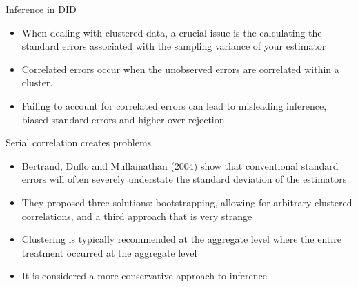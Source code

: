 \documentclass{beamer}
\begin{document}
\begin{frame}{Inference in DID}
	\begin{itemize}
	\item When dealing with clustered data, a crucial issue is the calculating the standard errors associated with the sampling variance of your estimator
 	\item Correlated errors occur when the unobserved errors are correlated within a cluster.
	\item Failing to account for correlated errors can lead to misleading inference, biased standard errors and higher over rejection
	\end{itemize}
\end{frame}


\begin{frame}{Serial correlation creates problems}
  \begin{itemize}
	\item  Bertrand, Duflo and Mullainathan (2004) show that conventional standard errors will often severely understate the standard deviation of the estimators
	\item They proposed three solutions: bootstrapping, allowing for arbitrary clustered correlations, and a third approach that is very strange
	    \item Clustering is typically recommended at the aggregate level where the entire treatment occurred at the aggregate level 
	    \item It is considered a more conservative approach to inference

  \end{itemize}
\end{frame}








  
\end{document}
